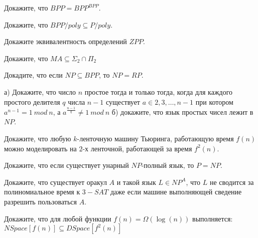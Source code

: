 \setcounter{curtask}{26}


\begin{task}
    Докажите, что $BPP = BPP^{BPP}$.
\end{task}

\begin{task}
    Докажите, что $BPP/poly \subseteq P/poly$.
\end{task}

\begin{task}
    Докажите эквивалентность определений $ZPP$.
\end{task}

\begin{task}
    Докажите, что $MA \subseteq \Sigma_2 \cap \Pi_2$
\end{task}

\begin{task}
    Докадите, что если $NP \subseteq BPP$, то $NP = RP$.
\end{task}

\breakline

\begin{ptask}{4}
    а) Докажите, что число $n$ простое тогда и только тогда, когда для каждого
    простого делителя $q$ числа $n - 1$ существует $a \in {2, 3, \dots, n - 1}$ при котором
    $a^{n - 1} = 1~mod~n$, а $a^{\frac{n - 1}{q}} \ne 1~mod~n$
    б) докажите, что язык простых чисел лежит в $NP$.
\end{ptask}

\begin{ptask}{8}
    Докажите, что любую $k$-ленточную машину Тьюринга, работающую время $f(n)$ можно
    моделировать на $2$-х ленточной, работающей за время $f^2(n)$.
\end{ptask}


\begin{ptask}{12}
	Докажите, что если существует унарный $NP$-полный язык, то $P = NP$.
\end{ptask}

\begin{ptask}{13}
    Докажите, что существует оракул $A$ и такой язык $L \in NP^A$, что $L$ не
    сводится за полиномиальное время к $3-SAT$ даже если машине выполняющей сведение
    разрешить пользоваться $A$.
\end{ptask}

\begin{ptask}{17}
    Докажите, что для любой функции $f(n) = \Omega(\log(n))$ выполняется:
    $NSpace[f(n)] \subseteq DSpace[f^2(n)]$
\end{ptask}

